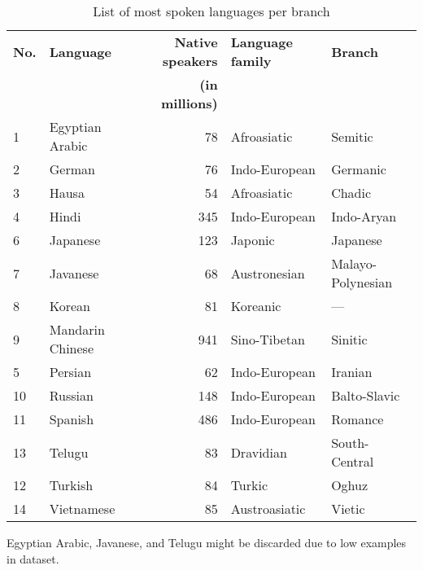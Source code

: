 \documentclass[a4paper]{article}
\begin{document}
\begin{table}[htbp]
    \small
    \centering
    \begin{tabular}{|l|l|r|l|l|}
        \hline
        \textbf{No.} & \textbf{Language} & \textbf{Native speakers} & \textbf{Language family} & \textbf{Branch}   \\
                     &                   & \textbf{(in millions)}   &                          &                   \\
        \hline
        1            & Egyptian Arabic   & 78                       & Afroasiatic              & Semitic           \\
        2            & German            & 76                       & Indo-European            & Germanic          \\
        3            & Hausa             & 54                       & Afroasiatic              & Chadic            \\
        4            & Hindi             & 345                      & Indo-European            & Indo-Aryan        \\
        6            & Japanese          & 123                      & Japonic                  & Japanese          \\
        7            & Javanese          & 68                       & Austronesian             & Malayo-Polynesian \\
        8            & Korean            & 81                       & Koreanic                 & —                 \\
        9            & Mandarin Chinese  & 941                      & Sino-Tibetan             & Sinitic           \\
        5            & Persian           & 62                       & Indo-European            & Iranian           \\
        10           & Russian           & 148                      & Indo-European            & Balto-Slavic      \\
        11           & Spanish           & 486                      & Indo-European            & Romance           \\
        13           & Telugu            & 83                       & Dravidian                & South-Central     \\
        12           & Turkish           & 84                       & Turkic                   & Oghuz             \\
        14           & Vietnamese        & 85                       & Austroasiatic            & Vietic            \\
        \hline
    \end{tabular}
    \caption{List of most spoken languages per branch}
\end{table}

Egyptian Arabic, Javanese, and Telugu might be discarded due to low examples in dataset.

\printbibliography
\end{document}
